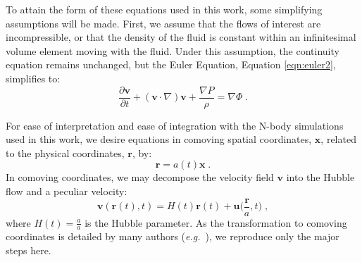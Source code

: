 \documentclass{aastex}
\newcommand{\eg}{\textit{e.g.}~}
\begin{document}
To attain the form of these equations used in this work, some
simplifying assumptions will be made.  
First, we assume that
the flows of interest are incompressible, or that the density of
the fluid is constant within an infinitesimal
volume element moving with the fluid.  
Under this assumption, the continuity equation remains unchanged, but
the Euler Equation, Equation \eqref{eqn:euler2}, simplifies to:
\begin{equation}\label{eqn:euler3}
  \frac{ \partial \mathbf{v} }{\partial t} + ( \mathbf{v} \cdot \nabla )
  \mathbf{v} + \frac{ \nabla P }{\rho} = \nabla \Phi \;.
\end{equation} 

For ease of interpretation and ease of integration with the N-body simulations
used in this work, we desire equations in comoving spatial
coordinates, $\mathbf{x}$, related to the physical coordinates, $\mathbf{r}$, by:
\begin{equation}\label{eqn:comovingx}
  \mathbf{r} = a(t) \mathbf{x} \;.
\end{equation}
In comoving coordinates, we may decompose the velocity field $\mathbf{v}$ 
into the 
Hubble flow and a peculiar velocity: %
\begin{equation}\label{eqn:comovingv}
  \mathbf{v}(\mathbf{r}(t),t)=H(t)\mathbf{r}(t) +
  \mathbf{u}\bigg(\frac{\mathbf{r}}{a},t\bigg) \;,
\end{equation}
where $H(t) = \frac{\dot{a}}{{a}}$ is the Hubble parameter.
As the transformation to comoving coordinates is detailed by many
authors (\eg \cite{peebles,schneider,baumann}), we
reproduce only the major steps here.
\end{document}
